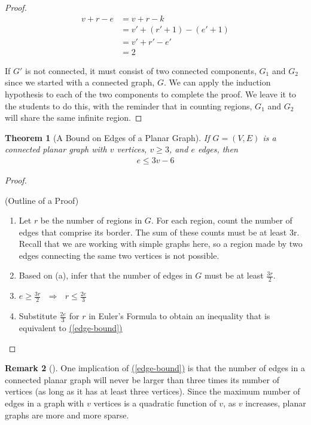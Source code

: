 \documentclass[10pt,]{book}
\theoremstyle{plain}
\newtheorem{theorem}{Theorem}[section]
\theoremstyle{definition}
\theoremstyle{definition}
\newtheorem{remark}[theorem]{Remark}
\theoremstyle{definition}
\theoremstyle{definition}
\theoremstyle{definition}
\numberwithin{equation}{section}
\begin{document}
\begin{proof}
\begin{equation*}\begin{split}
v+ r -e &= v+r-k\\
	&= v' + (r'+1) -(e'+1)\\
	& = v' + r'-e'\\
	& =2
\end{split}
\end{equation*}

If \(G'\) is not connected, it must consist of two connected components, \(G_1\)  and \(G_2\) since
we started with a connected graph, \(G\). We can apply the induction hypothesis to each of the two components to complete the proof. 
We leave it to the students to do this, with the reminder that in counting regions, \(G_1\)  and \(G_2\)  will share the same
infinite region.%
\end{proof}
\begin{theorem}[A Bound on Edges of a Planar Graph]\label{theorem-edge-bound}
If \(G = (V, E)\) is a connected planar graph with \(v\) vertices, \(v\geq 3\), and \(e\) edges, then
\begin{gather}
e \leq  3v - 6\label{edge-bound}
\end{gather}
%
\end{theorem}
\begin{proof}\hypertarget{proof-6}{}
(Outline of a Proof)%
\par
\leavevmode%
\begin{enumerate}[label=\alph*]
\item\hypertarget{li-125}{} Let \(r\) be the number of regions in \(G\). For each region, count the number of edges that comprise its border. The sum of these counts must be at least  3r. Recall that we are working with simple graphs here, so a region made by two edges connecting the same two
vertices is not possible.%
\item\hypertarget{li-126}{} Based on (a), infer that the number of edges in \(G\) must be at least \(\frac{3 r}{2}\).%
\item\hypertarget{li-127}{} \(e\geq \frac{3r}{2}\text{   }\Rightarrow \text{      }r\leq \frac{2e}{3}\)%
\item\hypertarget{li-128}{}Substitute \(\frac{2e}{3}\) for \(r\) in Euler's Formula to obtain an inequality that is equivalent to  \hyperref[edge-bound]{(\ref{edge-bound})}%
\end{enumerate}
%
\end{proof}
\begin{remark}[]\label{remark-1}
One implication of \hyperref[edge-bound]{(\ref{edge-bound})} is that the number of edges in a connected planar graph will never be larger than three times its
number of vertices (as long as it has at least three vertices). Since the maximum number of edges in a graph with \(v\) vertices is a quadratic function of \(v\), as \(v\) increases, planar graphs are more and more sparse.%
\end{remark}
\end{document}
